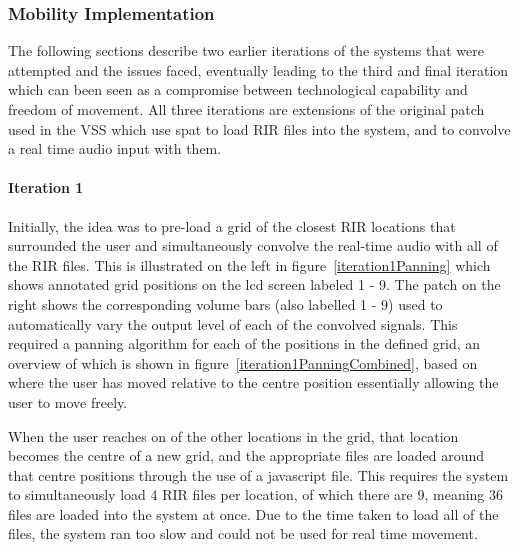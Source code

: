 \documentclass[../../main.tex]{subfiles}
\begin{document}
		\subsubsection{Mobility Implementation}

		The following sections describe two earlier iterations of the systems that were attempted and the issues faced, eventually leading to the third and final iteration which can been seen as a compromise between technological capability and freedom of movement. All three iterations are extensions of the original patch used in the \ac{VSS} which use spat to load \ac{RIR} files into the system, and to convolve a real time audio input with them.

		 \paragraph{Iteration 1}

		 	Initially, the idea was to pre-load a grid of the closest \ac{RIR} locations that surrounded the user and simultaneously convolve the real-time audio with all of the \ac{RIR} files. This is illustrated on the left in figure~\ref{iteration1Panning} which shows annotated grid positions on the lcd screen labeled 1 - 9. The patch on the right shows the corresponding volume bars (also labelled 1 - 9) used to automatically vary the output level of each of the convolved signals. This required a panning algorithm for each of the positions in the defined grid, an overview of which is shown in figure~\ref{iteration1PanningCombined}, based on where the user has moved relative to the centre position essentially allowing the user to move freely.

		 	When the user reaches on of the other locations in the grid, that location becomes the centre of a new grid, and the appropriate files are loaded around that centre positions through the use of a javascript file. This requires the system to simultaneously load 4 \ac{RIR} files per location, of which there are 9, meaning 36 files are loaded into the system at once. Due to the time taken to load all of the files, the system ran too slow and could not be used for real time movement.
\end{document}
